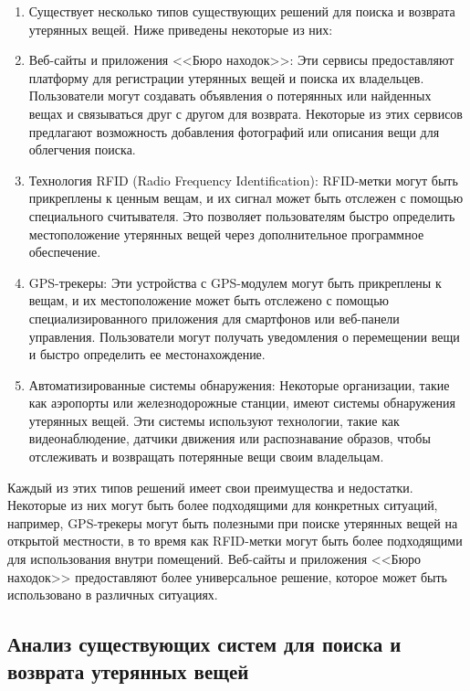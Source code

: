 \documentclass{mirea}
\begin{document}
\begin{enumerate}
	\item[] Существует несколько типов существующих решений для поиска и возврата утерянных вещей. Ниже приведены некоторые из них:
	
	\item Веб-сайты и приложения <<Бюро находок>>: Эти сервисы предоставляют платформу для регистрации утерянных вещей и поиска их владельцев. Пользователи могут создавать объявления о потерянных или найденных вещах и связываться друг с другом для возврата. Некоторые из этих сервисов предлагают возможность добавления фотографий или описания вещи для облегчения поиска.
	
	\item Технология RFID (Radio Frequency Identification): RFID-метки могут быть прикреплены к ценным вещам, и их сигнал может быть отслежен с помощью специального считывателя. Это позволяет пользователям быстро определить местоположение утерянных вещей через дополнительное программное обеспечение.
	
	\item GPS-трекеры: Эти устройства с GPS-модулем могут быть прикреплены к вещам, и их местоположение может быть отслежено с помощью специализированного приложения для смартфонов или веб-панели управления. Пользователи могут получать уведомления о перемещении вещи и быстро определить ее местонахождение.
	
	\item Автоматизированные системы обнаружения: Некоторые организации, такие как аэропорты или железнодорожные станции, имеют системы обнаружения утерянных вещей. Эти системы используют технологии, такие как видеонаблюдение, датчики движения или распознавание образов, чтобы отслеживать и возвращать потерянные вещи своим владельцам.
\end{enumerate}

Каждый из этих типов решений имеет свои преимущества и недостатки. Некоторые из них могут быть более подходящими для конкретных ситуаций, например, GPS-трекеры могут быть полезными при поиске утерянных вещей на открытой местности, в то время как RFID-метки могут быть более подходящими для использования внутри помещений. Веб-сайты и приложения <<Бюро находок>> предоставляют более универсальное решение, которое может быть использовано в различных ситуациях.

\subsection{Анализ существующих систем для поиска и возврата утерянных вещей}
\end{document}
